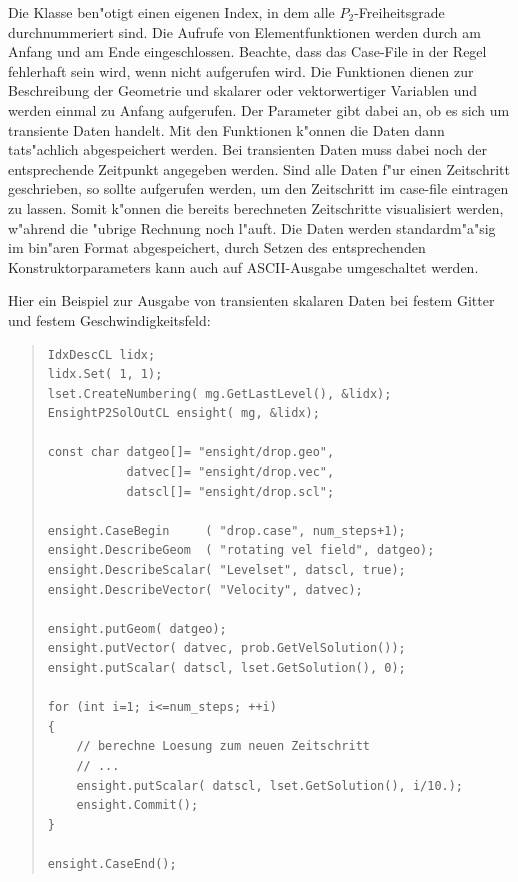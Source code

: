 \documentclass[11pt,a4paper]{article}
\newenvironment{Code}{\begin{quote}\scriptsize}{\end{quote}}
\begin{document}
Die Klasse  ben"otigt einen eigenen Index, in dem alle
$P_2$-Freiheitsgrade durchnummeriert sind. Die Aufrufe von Elementfunktionen
werden durch  am Anfang und  am Ende
eingeschlossen. Beachte, dass das Case-File in der Regel fehlerhaft sein
wird, wenn  nicht aufgerufen wird. Die Funktionen
 dienen zur Beschreibung der Geometrie und skalarer oder
vektorwertiger Variablen und werden einmal zu Anfang aufgerufen. Der Parameter
 gibt dabei an, ob es sich um transiente Daten handelt. Mit den
Funktionen  k"onnen die Daten dann tats"achlich abgespeichert
werden. Bei transienten Daten muss dabei noch der entsprechende Zeitpunkt
angegeben werden. 
Sind alle Daten f"ur einen Zeitschritt geschrieben, so sollte 
 aufgerufen werden, um den Zeitschritt im case-file eintragen zu lassen. 
Somit k"onnen die bereits berechneten Zeitschritte visualisiert werden, w"ahrend die 
"ubrige Rechnung noch l"auft. Die Daten werden standardm"a"sig im bin"aren Format 
abgespeichert, durch Setzen des entsprechenden Konstruktorparameters 
kann auch auf ASCII-Ausgabe umgeschaltet werden.

Hier ein Beispiel zur Ausgabe von transienten skalaren Daten bei festem Gitter
und festem Geschwindigkeitsfeld:
\begin{Code}
\begin{verbatim}
IdxDescCL lidx;
lidx.Set( 1, 1);
lset.CreateNumbering( mg.GetLastLevel(), &lidx);
EnsightP2SolOutCL ensight( mg, &lidx);

const char datgeo[]= "ensight/drop.geo", 
           datvec[]= "ensight/drop.vec",
           datscl[]= "ensight/drop.scl";

ensight.CaseBegin     ( "drop.case", num_steps+1);
ensight.DescribeGeom  ( "rotating vel field", datgeo);
ensight.DescribeScalar( "Levelset", datscl, true); 
ensight.DescribeVector( "Velocity", datvec); 

ensight.putGeom( datgeo);
ensight.putVector( datvec, prob.GetVelSolution());
ensight.putScalar( datscl, lset.GetSolution(), 0);

for (int i=1; i<=num_steps; ++i)
{
    // berechne Loesung zum neuen Zeitschritt
    // ...
    ensight.putScalar( datscl, lset.GetSolution(), i/10.);
    ensight.Commit();
}

ensight.CaseEnd();
\end{verbatim}
\end{Code}
\end{document}
